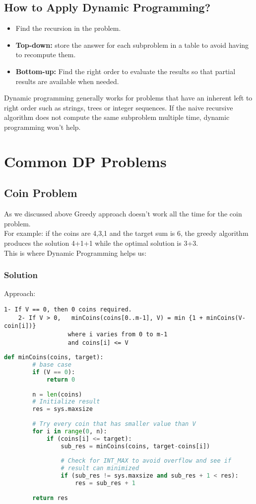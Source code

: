 \documentclass[12pt]{article}
\begin{document}
	\subsection{How to Apply Dynamic Programming?}
		\begin{itemize}
    		\item {Find the recursion in the problem.}
    		\item {\textbf{Top-down:} store the answer for each subproblem in a table to avoid having to recompute them.}
		    \item {\textbf{Bottom-up:} Find the right order to evaluate the results so that partial results are available when needed.}
		\end{itemize}
		Dynamic programming generally works for problems that have an inherent left to right order such as strings, trees or integer sequences. If the naive recursive algorithm does not compute the same subproblem multiple time, dynamic programming won't help.
    
	
	\newpage
	\section{Common DP Problems}
	\subsection{Coin Problem}
	As we discussed above Greedy approach doesn't work all the time for the coin problem. \\
	For example: if the coins are {4,3,1} and the target sum is 6, the greedy algorithm produces the solution 4+1+1 while the optimal solution is 3+3.\\
	This is where Dynamic Programming helps us:
	\subsubsection{Solution}
    Approach:
	\begin{lstlisting}[numbers=none, frame=none]
    1- If V == 0, then 0 coins required.
    2- If V > 0,   minCoins(coins[0..m-1], V) = min {1 + minCoins(V-coin[i])}
                  where i varies from 0 to m-1
                  and coins[i] <= V
	\end{lstlisting}
	
	\begin{lstlisting}[language=Python]
	def minCoins(coins, target): 
        # base case 
        if (V == 0): 
            return 0
        
	    n = len(coins) 
        # Initialize result 
        res = sys.maxsize 
          
        # Try every coin that has smaller value than V 
        for i in range(0, n): 
            if (coins[i] <= target): 
                sub_res = minCoins(coins, target-coins[i]) 
      
                # Check for INT_MAX to avoid overflow and see if 
                # result can minimized 
                if (sub_res != sys.maxsize and sub_res + 1 < res): 
                    res = sub_res + 1
      
        return res 
        
    \end{lstlisting}
	\newpage
\end{document}
